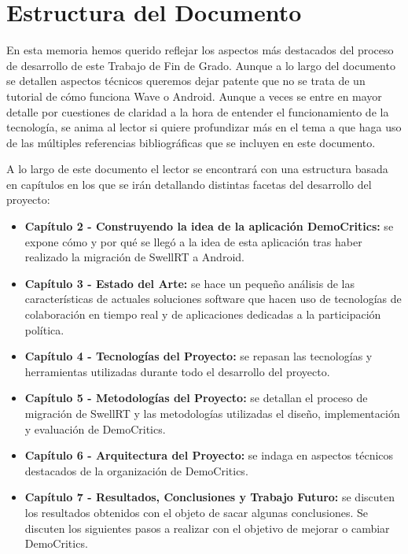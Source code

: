 \section{Estructura del Documento}

En esta memoria hemos querido reflejar los aspectos más destacados del proceso de desarrollo de este Trabajo de Fin de Grado. Aunque a lo largo del documento se detallen aspectos técnicos queremos dejar patente que no se trata de un tutorial de cómo funciona Wave o Android. Aunque a veces se entre en mayor detalle por cuestiones de claridad a la hora de entender el funcionamiento de la tecnología, se anima al lector si quiere profundizar más en el tema a que haga uso de las múltiples referencias bibliográficas que se incluyen en este documento.  

A lo largo de este documento el lector se encontrará con una estructura basada en capítulos en los que se irán detallando distintas facetas del desarrollo del proyecto: 

\begin{itemize}
  \item \textbf{Capítulo 2 - Construyendo la idea de la aplicación DemoCritics:} se expone cómo y por qué se llegó a la idea de esta aplicación tras haber realizado la migración de SwellRT a Android.
  \item \textbf{Capítulo 3 - Estado del Arte:} se hace un pequeño análisis de las características de actuales soluciones software que hacen uso de tecnologías de colaboración en tiempo real y de aplicaciones dedicadas a la participación política.
  \item \textbf{Capítulo 4 - Tecnologías del Proyecto:} se repasan las tecnologías y herramientas utilizadas durante todo el desarrollo del proyecto.
  \item \textbf{Capítulo 5 - Metodologías del Proyecto:} se detallan el proceso de migración de SwellRT y las metodologías utilizadas el diseño, implementación y evaluación de DemoCritics.
  \item \textbf{Capítulo 6 - Arquitectura del Proyecto:} se indaga en aspectos técnicos destacados de la organización de DemoCritics.
  \item \textbf{Capítulo 7 - Resultados, Conclusiones y Trabajo Futuro:} se discuten los resultados obtenidos con el objeto de sacar algunas conclusiones. Se discuten los siguientes pasos a realizar con el objetivo  de mejorar o cambiar DemoCritics.
\end{itemize}
